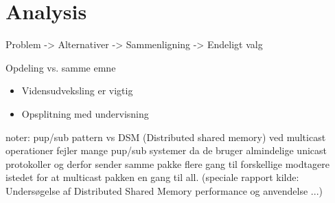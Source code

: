 \chapter{Analysis}
Problem -> Alternativer -> Sammenligning -> Endeligt valg


Opdeling vs. samme emne
\begin{itemize}
\item Vidensudveksling er vigtig
\item  Opsplitning med undervisning
\end{itemize}


noter:
pup/sub pattern vs DSM (Distributed shared memory)
ved multicast operationer fejler mange pup/sub systemer da de bruger almindelige unicast protokoller og derfor sender samme pakke flere gang til forskellige modtagere istedet for at multicast pakken en gang til all. (speciale rapport kilde: Unders\o gelse af Distributed Shared Memory performance og anvendelse ...)

